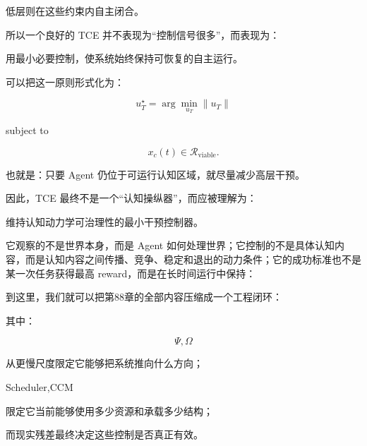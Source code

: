 低层则在这些约束内自主闭合。

所以一个良好的 TCE 并不表现为“控制信号很多”，而表现为：

\begin{statementbox}
用最小必要控制，使系统始终保持可恢复的自主运行。
\end{statementbox}

可以把这一原则形式化为：

\[
u_T^\star
=
\arg\min_{u_T}
\|u_T\|
\]

subject to

\[
x_c(t)
\in
\mathcal R_{\mathrm{viable}}.
\]

也就是：只要 Agent 仍位于可运行认知区域，就尽量减少高层干预。

因此，TCE 最终不是一个“认知操纵器”，而应被理解为：

\begin{statementbox}
维持认知动力学可治理性的最小干预控制器。
\end{statementbox}

它观察的不是世界本身，而是 Agent 如何处理世界；它控制的不是具体认知内容，而是认知内容之间传播、竞争、稳定和退出的动力条件；它的成功标准也不是某一次任务获得最高 reward，而是在长时间运行中保持：

\begin{statementbox}
\centering
{}
\end{statementbox}

到这里，我们就可以把第88章的全部内容压缩成一个工程闭环：

\begin{statementbox}
\centering
{}
\end{statementbox}

其中：

\[
\boxed{
\Psi,\Omega
}
\]

从更慢尺度限定它能够把系统推向什么方向；

\begin{statementbox}
Scheduler,CCM
\end{statementbox}

限定它当前能够使用多少资源和承载多少结构；

而现实残差最终决定这些控制是否真正有效。

